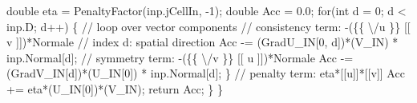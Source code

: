 {\btab \btab double eta = PenaltyFactor(inp.jCellIn, -1);\newline 
\btab \btab double Acc = 0.0;\newline 
\btab \btab for(int d = 0; d < inp.D; d++) \{ // loop over vector components \newline 
\btab \btab \btab // consistency term: -(\{\{ \textbackslash /u \}\} [[ v ]])*Normale\newline 
\btab \btab \btab // index d: spatial direction\newline 
\btab \btab \btab Acc -= (GradU\_IN[0, d])*(V\_IN) * inp.Normal[d];\newline 
 \newline 
\btab \btab \btab // symmetry term: -(\{\{ \textbackslash /v \}\} [[ u ]])*Normale\newline 
\btab \btab \btab Acc -= (GradV\_IN[d])*(U\_IN[0]) * inp.Normal[d];\newline 
\btab \btab \}\newline 
 \newline 
\btab \btab // penalty term: eta*[[u]]*[[v]]\newline 
\btab \btab Acc += eta*(U\_IN[0])*(V\_IN);\newline 
 \newline 
 \newline 
\btab \btab return Acc;\newline 
\btab \}\newline 
\}
 }
\BoSSSexe
